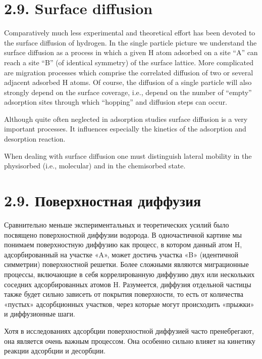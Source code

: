 \documentclass[11pt]{article}
\begin{document}
    \section{2.9. Surface diffusion}\label{surface-diffusion}

    Comparatively much less experimental and theoretical effort has been
devoted to the surface diffusion of hydrogen. In the single particle
picture we understand the surface diffusion as a process in which a
given H atom adsorbed on a site ``A'' can reach a site ``B'' (of
identical symmetry) of the surface lattice. More complicated are
migration processes which comprise the correlated diffusion of two or
several adjacent adsorbed H atoms. Of course, the diffusion of a single
particle will also strongly depend on the surface coverage, i.e., depend
on the number of ``empty'' adsorption sites through which ``hopping''
and diffusion steps can occur.

Although quite often neglected in adsorption studies surface diffusion
is a very important processes. It influences especially the kinetics of
the adsorption and desorption reaction.

When dealing with surface diffusion one must distinguish lateral
mobility in the physisorbed (i.e., molecular) and in the chemisorbed
state.

    \section{2.9. Поверхностная
диффузия}\label{ux43fux43eux432ux435ux440ux445ux43dux43eux441ux442ux43dux430ux44f-ux434ux438ux444ux444ux443ux437ux438ux44f}

    Сравнительно меньше экспериментальных и теоретических усилий было
посвящено поверхностной диффузии водорода. В одночастичной картине мы
понимаем поверхностную диффузию как процесс, в котором данный атом H,
адсорбированный на участке «A», может достичь участка «B» (идентичной
симметрии) поверхностной решетки. Более сложными являются миграционные
процессы, включающие в себя коррелированную диффузию двух или нескольких
соседних адсорбированных атомов H. Разумеется, диффузия отдельной
частицы также будет сильно зависеть от покрытия поверхности, то есть от
количества «пустых» адсорбционных участков, через которые могут
происходить «прыжки» и диффузионные шаги.

Хотя в исследованиях адсорбции поверхностной диффузией часто
пренебрегают, она является очень важным процессом. Она особенно сильно
влияет на кинетику реакции адсорбции и десорбции.
\end{document}
